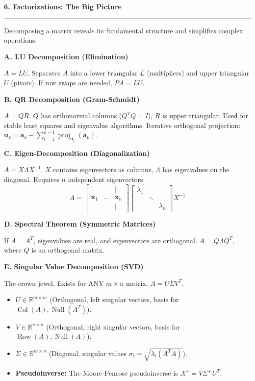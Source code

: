 \documentclass[10pt, landscape, twocolumn]{article}
\newcommand{\cheatsheetsection}[1]{
    \vspace{0.6em}
    {\color{themeblue}\large\bfseries #1} \par
    \vspace{-0.5em}
    {\color{themeblue}\rule{\linewidth}{1pt}} \par
    \vspace{0.2em}
}
\newcommand{\cheatsheetsubsection}[1]{
    \vspace{0.4em}
    {\color{themeblue}\normalsize\bfseries #1} \par
    \vspace{0.1em}
}
\begin{document}
\cheatsheetsection{6. Factorizations: The Big Picture}
Decomposing a matrix reveals its fundamental structure and simplifies complex operations. 

\cheatsheetsubsection{A. LU Decomposition (Elimination)}
$A = LU$. Separates $A$ into a lower triangular $L$ (multipliers) and upper triangular $U$ (pivots). If row swaps are needed, $PA = LU$.

\cheatsheetsubsection{B. QR Decomposition (Gram-Schmidt)}
$A = QR$. $Q$ has orthonormal columns ($Q^T Q = I$), $R$ is upper triangular. Used for stable least squares and eigenvalue algorithms. Iterative orthogonal projection: $\mathbf{u}_k = \mathbf{a}_k - \sum_{i=1}^{k-1} \operatorname{proj}_{\mathbf{u}_i}(\mathbf{a}_k)$.

\cheatsheetsubsection{C. Eigen-Decomposition (Diagonalization)}
$A = X \Lambda X^{-1}$. $X$ contains eigenvectors as columns, $\Lambda$ has eigenvalues on the diagonal. Requires $n$ independent eigenvectors.
\[ A = \begin{bmatrix} | & & | \\ \mathbf{x}_1 & \dots & \mathbf{x}_n \\ | & & | \end{bmatrix} \begin{bmatrix} \lambda_1 & & \\ & \ddots & \\ & & \lambda_n \end{bmatrix} X^{-1} \]

\cheatsheetsubsection{D. Spectral Theorem (Symmetric Matrices)}
If $A = A^T$, eigenvalues are real, and eigenvectors are orthogonal. $A = Q \Lambda Q^T$, where $Q$ is an orthogonal matrix. 

\cheatsheetsubsection{E. Singular Value Decomposition (SVD)}
The crown jewel. Exists for ANY $m \times n$ matrix. $A = U \Sigma V^T$.
\begin{itemize}[leftmargin=*, itemsep=4pt, parsep=0pt]
    \item $U \in \mathbb{R}^{m \times m}$ (Orthogonal, left singular vectors, basis for $\operatorname{Col}(A), \operatorname{Null}(A^T)$).
    \item $V \in \mathbb{R}^{n \times n}$ (Orthogonal, right singular vectors, basis for $\operatorname{Row}(A), \operatorname{Null}(A)$).
    \item $\Sigma \in \mathbb{R}^{m \times n}$ (Diagonal, singular values $\sigma_i = \sqrt{\lambda_i(A^T A)}$).
    \item \textbf{Pseudoinverse:} The Moore-Penrose pseudoinverse is $A^+ = V \Sigma^+ U^T$.
\end{itemize}
\end{document}
